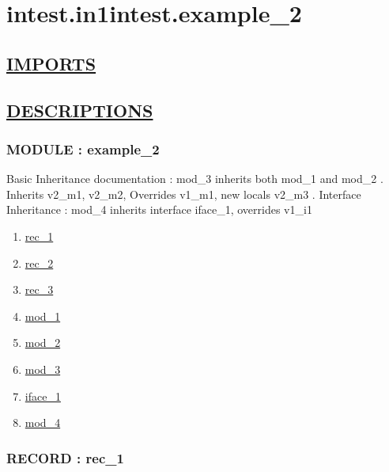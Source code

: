 \chapter*{intest.in1intest.example\_2}

\section*{\underline{IMPORTS}}

\section*{\underline{DESCRIPTIONS}}
\subsection*{MODULE : example\_2}
\hypertarget{ecldoc:intest.in1intest.example_2_intest.in1intest.example_2}{}
Basic Inheritance documentation : mod\_3 inherits both mod\_1 and mod\_2 . Inherits v2\_m1, v2\_m2, Overrides v1\_m1, new locals v2\_m3 . Interface Inheritance : mod\_4 inherits interface iface\_1, overrides v1\_i1 \\
\begin{enumerate}
\item \hyperlink{ecldoc:intest.in1intest.example_2_intest.in1intest.example_2.rec_1}{rec\_1}
\item \hyperlink{ecldoc:intest.in1intest.example_2_intest.in1intest.example_2.rec_2}{rec\_2}
\item \hyperlink{ecldoc:intest.in1intest.example_2_intest.in1intest.example_2.rec_3}{rec\_3}
\item \hyperlink{ecldoc:intest.in1intest.example_2_intest.in1intest.example_2.mod_1}{mod\_1}
\item \hyperlink{ecldoc:intest.in1intest.example_2_intest.in1intest.example_2.mod_2}{mod\_2}
\item \hyperlink{ecldoc:intest.in1intest.example_2_intest.in1intest.example_2.mod_3}{mod\_3}
\item \hyperlink{ecldoc:intest.in1intest.example_2_intest.in1intest.example_2.iface_1}{iface\_1}
\item \hyperlink{ecldoc:intest.in1intest.example_2_intest.in1intest.example_2.mod_4}{mod\_4}
\end{enumerate}
\subsection*{RECORD : rec\_1}
\hypertarget{ecldoc:intest.in1intest.example_2_intest.in1intest.example_2.rec_1}{}
